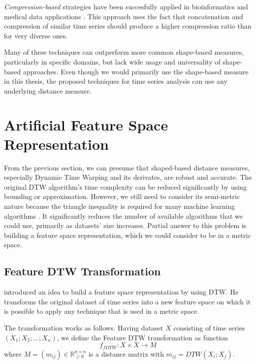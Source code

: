 \textit{Compression-based} strategies have been succesfully applied in bioinformatics and medical data applications \cite{met:cdm, met:cdm-santos, met:cdm-espoti}. This approach uses the fact that concatenation and compression of similar time series should produce a higher compression ratio than for very diverse ones.


Many of these techniques can outperform more common shape-based measures, particularly in specific domains, but lack wide usage and universality of shape-based approaches. Even though we would primarily use the shape-based measure in this thesis, the proposed techniques for time series analysis can use any underlying distance measure.


\section{Artificial Feature Space Representation}
From the previous section, we can presume that shaped-based distance measures, especially Dynamic Time Warping and its derivates, are robust and accurate. The original DTW algorithm's time complexity can be reduced significantly by using bounding or approximation. However, we still need to consider its semi-metric nature because the triangle inequality is required for many machine learning algorithms \cite{cluster:decade-review}. It significantly reduces the number of available algorithms that we could use, primarily as datasets' size increases. Partial answer to this problem is building a feature space representation, which we could consider to be in a metric space.

\subsection{Feature DTW Transformation}
\textcite{met:fDTW} introduced an idea to build a feature space representation by using DTW. He transforms the original dataset of time series into a new feature space on which it is possible to apply any technique that is used in a metric space.

The transformation works as follows. Having dataset $X$ consisting of time series $(X_1; X_2; ...; X_n)$, we define the Feature DTW transformation as function
\begin{equation}
    f_{fDTW}: X \times X \rightarrow M
\end{equation}
where $M=(m_{ij}) \in \mathbb{R}_{\ge 0}^{n \times n}$ is a distance matrix with $m_{ij}=DTW(X_i; X_j)$.
 

